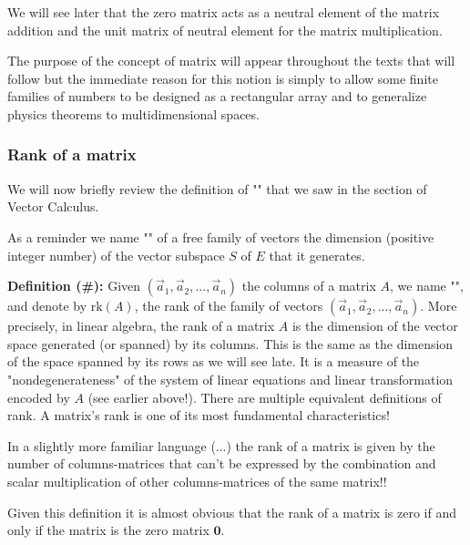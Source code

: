 	We will see later that the zero matrix acts as a neutral element of the matrix addition and the unit matrix of neutral element for the matrix multiplication.
	
	The purpose of the concept of matrix will appear throughout the texts that will follow but the immediate reason for this notion is simply to allow some finite families of numbers to be designed as a rectangular array and to generalize physics theorems to multidimensional spaces.
	
	\subsubsection{Rank of a matrix}\label{rank of a matrix}
	We will now briefly review the definition of "" that we saw in the section of Vector Calculus.
	
	As a reminder we name "" of a free family of vectors the dimension (positive integer number) of the vector subspace $S$ of $E$ that it generates.
	
	\textbf{Definition (\#\mydef):} Given $(\vec{a}_1,\vec{a}_2,...,\vec{a}_n)$ the columns of a matrix $A$, we name "", and denote by $\text{rk}(A)$, the rank of the family of vectors $(\vec{a}_1,\vec{a}_2,...,\vec{a}_n)$. More precisely, in linear algebra, the rank of a matrix $A$ is the dimension of the vector space generated (or spanned) by its columns. This is the same as the dimension of the space spanned by its rows as we will see late. It is a measure of the "nondegenerateness" of the system of linear equations and linear transformation encoded by $A$ (see earlier above!). There are multiple equivalent definitions of rank. A matrix's rank is one of its most fundamental characteristics!
	
	In a slightly more familiar language (...) the rank of a matrix is given by the number of columns-matrices that can't be expressed by the combination and scalar multiplication of other columns-matrices of the same matrix!!
	
	Given this definition it is almost obvious that the rank of a matrix is zero if and only if the matrix is the zero matrix $\mathbf{0}$.
	
